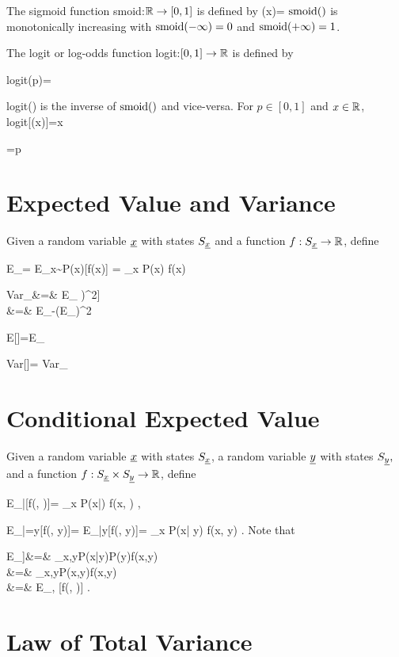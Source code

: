 The sigmoid function smoid:${ \mathbb{R}}\rightarrow [0,1]$
is defined by
\beq
\smoid(x)=
\eeq
${\rm smoid}()$ is monotonically
increasing with ${\rm smoid}(-\infty)=0$ and ${\rm smoid}(+\infty)=1$.

The logit or log-odds function 
logit:$[0,1]\rightarrow { \mathbb{R}}$ is defined by

\beq
{\rm logit}(p)=\ln{}
\eeq

logit() is the inverse of ${\rm smoid}()$ and vice-versa.
For $p\in[0,1]$ and $x\in { \mathbb{R}}$,
\beq
{\rm logit}[\smoid(x)]=x
\eeq

\beq
\smoid [{\rm logit}(p)] =p
\eeq



\section{Expected Value and Variance}

Given a random variable
 ${\underline{x}}$ with states $S_{\underline{x}}$ and 
a function $f:S_{\underline{x}}\rightarrow { \mathbb{R}}$, define

\beq
E_\rvx[f(\rvx)]=
E_{x\sim P(x)}[f(x)] = \sum_x P(x) f(x)
\eeq

\beqa
Var_\rvx[f(\rvx)]&=& E_\rvx
\left[(f(\rvx)-E_\rvx[f(\rvx)])^2\right]
\\
&=&
E_\rvx[f(\rvx)^2]-(E_\rvx[f(\rvx)])^2 
\eeqa

\beq
E[\rvx]=E_\rvx[\rvx]
\eeq

\beq
Var[\rvx]=
Var_\rvx[\rvx]
\eeq

\section{Conditional Expected Value}

Given a random variable ${\underline{x}}$ with states $S_{\underline{x}}$, a random variable ${\underline{y}}$ with states $S_{\underline{y}},$ and a function $f:S_{\underline{x}}\times S_{\underline{y}}\rightarrow { \mathbb{R}}$, define

\beq
E_{\rvx|\rvy}[f(\rvx, \rvy)]=
\sum_x P(x|\rvy) f(x, \rvy)
\;,
\eeq

\beq
E_{\rvx|\rvy=y}[f(\rvx, y)]=
E_{\rvx|y}[f(\rvx, y)]= \sum_x P(x| y) f(x, y)
\;.
\eeq
Note that

\beqa
E_\rvy[E_{\rvx|\rvy}[f(\rvx, \rvy)]]&=&
\sum_{x,y}P(x|y)P(y)f(x,y)
\\&=&
\sum_{x,y}P(x,y)f(x,y)
\\&=&
E_{\rvx, \rvy}[f(\rvx, \rvy)]
\;.
\eeqa

\section{Law of Total Variance}

